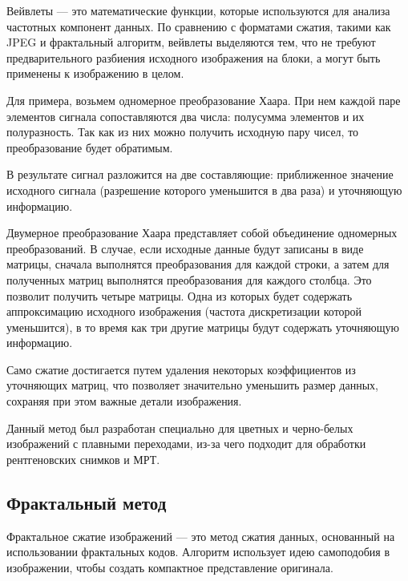 Вейвлеты --- это математические функции, которые используются для анализа частотных компонент данных. По сравнению с форматами сжатия, такими как JPEG и фрактальный алгоритм, вейвлеты выделяются тем, что не требуют предварительного разбиения исходного изображения на блоки, а могут быть применены к изображению в целом.

Для примера, возьмем одномерное преобразование Хаара. При нем каждой паре элементов сигнала сопоставляются два числа: полусумма элементов и их полуразность. Так как из них можно получить исходную пару чисел, то преобразование будет обратимым.

В результате сигнал разложится на две составляющие: приближенное значение исходного сигнала (разрешение которого уменьшится в два раза) и уточняющую информацию.

Двумерное преобразование Хаара представляет собой объединение одномерных преобразований. В случае, если исходные данные будут записаны в виде матрицы, сначала выполнятся преобразования для каждой строки, а затем для полученных матриц выполнятся преобразования для каждого столбца. Это позволит получить четыре матрицы. Одна из которых будет содержать аппроксимацию исходного изображения (частота дискретизации которой уменьшится), в то время как три другие матрицы будут содержать уточняющую информацию. 

Само сжатие достигается путем удаления некоторых коэффициентов из уточняющих матриц, что позволяет значительно уменьшить размер данных, сохраняя при этом важные детали изображения.

Данный метод был разработан специально для цветных и черно-белых изображений с плавными переходами, из-за чего подходит для обработки рентгеновских снимков и МРТ.

\subsection{Фрактальный метод}

Фрактальное сжатие изображений --- это метод сжатия данных, основанный на использовании фрактальных кодов. Алгоритм использует идею самоподобия в изображении, чтобы создать компактное представление оригинала.


